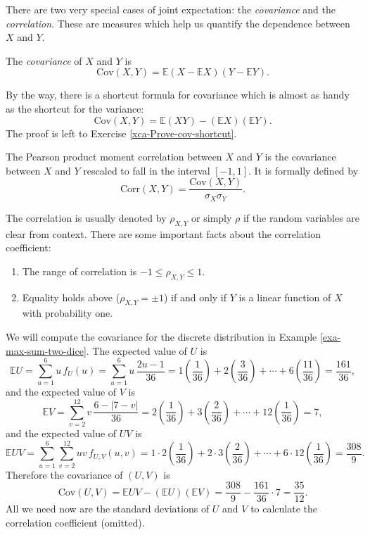 \documentclass[captions=tableheading]{scrbook}
\begin{document}
There are two very special cases of joint expectation: the \emph{covariance} and the \emph{correlation}. These are measures which help us quantify the dependence between \(X\) and \(Y\). 

\begin{defn}
The \emph{covariance} of \(X\) and \(Y\) is
\begin{equation}
\mbox{Cov}(X,Y)=\mathbb{E}(X-\mathbb{E} X)(Y-\mathbb{E} Y).
\end{equation}
\end{defn}

By the way, there is a shortcut formula for covariance which is almost as handy as the shortcut for the variance:
\begin{equation}
\mbox{Cov}(X,Y)=\mathbb{E}(XY)-(\mathbb{E} X)(\mathbb{E} Y).
\end{equation}
The proof is left to Exercise \ref{xca-Prove-cov-shortcut}.

The Pearson product moment correlation between \(X\) and \(Y\) is the covariance between \(X\) and \(Y\) rescaled to fall in the interval \([-1,1]\). It is formally defined by 
\begin{equation}
\mbox{Corr}(X,Y)=\frac{\mbox{Cov}(X,Y)}{\sigma_{X}\sigma_{Y}}.
\end{equation}

The correlation is usually denoted by \(\rho_{X,Y}\) or simply \(\rho\) if the random variables are clear from context. There are some important facts about the correlation coefficient: 
\begin{enumerate}
\item The range of correlation is \(-1\leq\rho_{X,Y}\leq1\).
\item Equality holds above (\(\rho_{X,Y}=\pm1\)) if and only if \(Y\) is a linear function of \(X\) with probability one.
\end{enumerate}

\begin{example}

We will compute the covariance for the discrete distribution in Example \ref{exa-max-sum-two-dice}. The expected value of \(U\) is
\[
\mathbb{E} U=\sum_{u=1}^{6}u\, f_{U}(u)=\sum_{u=1}^{6}u\,\frac{2u-1}{36}=1\left(\frac{1}{36}\right)+2\left(\frac{3}{36}\right)+\cdots+6\left(\frac{11}{36}\right)=\frac{161}{36},
\]
and the expected value of \(V\) is
\[
\mathbb{E} V=\sum_{v=2}^{12}v\,\frac{6-|7-v|}{36}=2\left(\frac{1}{36}\right)+3\left(\frac{2}{36}\right)+\cdots+12\left(\frac{1}{36}\right)=7,
\]
and the expected value of \(UV\) is
\[
\mathbb{E} UV=\sum_{u=1}^{6}\sum_{v=2}^{12}uv\, f_{U,V}(u,v)=1\cdot2\left(\frac{1}{36}\right)+2\cdot3\left(\frac{2}{36}\right)+\cdots+6\cdot12\left(\frac{1}{36}\right)=\frac{308}{9}.
\]
Therefore the covariance of \((U,V)\) is
\[
\mbox{Cov}(U,V)=\mathbb{E} UV-\left(\mathbb{E} U\right)\left(\mathbb{E} V\right)=\frac{308}{9}-\frac{161}{36}\cdot7=\frac{35}{12}.
\]
All we need now are the standard deviations of \(U\) and \(V\) to calculate the correlation coefficient (omitted).
\end{example}
\end{document}

